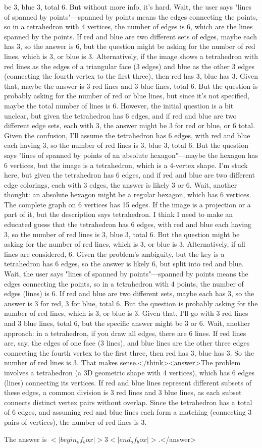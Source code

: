 be 3, blue 3, total 6. But without more info, it's hard. Wait, the user says "lines of spanned by points"—spanned by points means the edges connecting the points, so in a tetrahedron with 4 vertices, the number of edges is 6, which are the lines spanned by the points. If red and blue are two different sets of edges, maybe each has 3, so the answer is 6, but the question might be asking for the number of red lines, which is 3, or blue is 3. Alternatively, if the image shows a tetrahedron with red lines as the edges of a triangular face (3 edges) and blue as the other 3 edges (connecting the fourth vertex to the first three), then red has 3, blue has 3. Given that, maybe the answer is 3 red lines and 3 blue lines, total 6. But the question is probably asking for the number of red or blue lines, but since it's not specified, maybe the total number of lines is 6. However, the initial question is a bit unclear, but given the tetrahedron has 6 edges, and if red and blue are two different edge sets, each with 3, the answer might be 3 for red or blue, or 6 total. Given the confusion, I'll assume the tetrahedron has 6 edges, with red and blue each having 3, so the number of red lines is 3, blue 3, total 6. But the question says "lines of spanned by points of an absolute hexagon"—maybe the hexagon has 6 vertices, but the image is a tetrahedron, which is a 4-vertex shape. I'm stuck here, but given the tetrahedron has 6 edges, and if red and blue are two different edge colorings, each with 3 edges, the answer is likely 3 or 6. Wait, another thought: an absolute hexagon might be a regular hexagon, which has 6 vertices. The complete graph on 6 vertices has 15 edges. If the image is a projection or a part of it, but the description says tetrahedron. I think I need to make an educated guess that the tetrahedron has 6 edges, with red and blue each having 3, so the number of red lines is 3, blue 3, total 6. But the question might be asking for the number of red lines, which is 3, or blue is 3. Alternatively, if all lines are considered, 6. Given the problem's ambiguity, but the key is a tetrahedron has 6 edges, so the answer is likely 6, but split into red and blue. Wait, the user says "lines of spanned by points"—spanned by points means the edges connecting the points, so in a tetrahedron with 4 points, the number of edges (lines) is 6. If red and blue are two different sets, maybe each has 3, so the answer is 3 for red, 3 for blue, total 6. But the question is probably asking for the number of red lines, which is 3, or blue is 3. Given that, I'll go with 3 red lines and 3 blue lines, total 6, but the specific answer might be 3 or 6. Wait, another approach: in a tetrahedron, if you draw all edges, there are 6 lines. If red lines are, say, the edges of one face (3 lines), and blue lines are the other three edges connecting the fourth vertex to the first three, then red has 3, blue has 3. So the number of red lines is 3. That makes sense.</think><answer>The problem involves a tetrahedron (a 3D geometric shape with 4 vertices), which has 6 edges (lines) connecting its vertices. If red and blue lines represent different subsets of these edges, a common division is 3 red lines and 3 blue lines, as each subset connects distinct vertex pairs without overlap. Since the tetrahedron has a total of 6 edges, and assuming red and blue lines each form a matching (connecting 3 pairs of vertices), the number of red lines is 3.  

The answer is \(<|begin_of_box|>3<|end_of_box|>\).</answer>